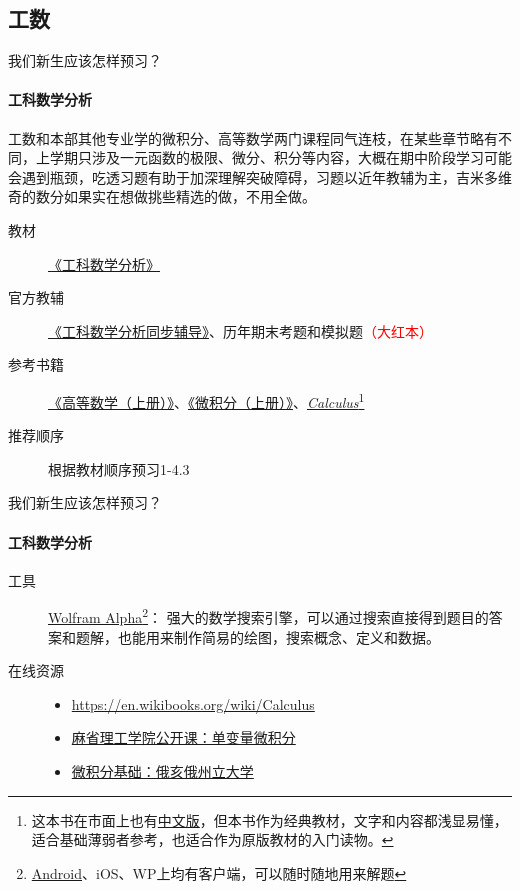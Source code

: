 \documentclass[xcolor={usenames,dvipsnames}]{beamer}
\begin{document}
\subsection{工数}
\begin{frame}{我们新生应该怎样预习？}
\framesubtitle{工科数学分析}
\begin{block}{}
工数和本部其他专业学的微积分、高等数学两门课程同气连枝，在某些章节略有不同，上学期只涉及一元函数的极限、微分、积分等内容，大概在期中阶段学习可能会遇到瓶颈，吃透习题有助于加深理解突破障碍，习题以近年教辅为主，吉米多维奇的数分如果实在想做挑些精选的做，不用全做。
\end{block}
\begin{description}
    \item[教材\faGraduationCap] \href{http://opac.lib.dlut.edu.cn/opac/item.php?marc_no=2008000575}{《工科数学分析》}
    \item[官方教辅\faPencil] \href{http://opac.lib.dlut.edu.cn/opac/item.php?marc_no=2010052839}{《工科数学分析同步辅导》}、历年期末考题和模拟题\textcolor{red}{（大红本）}
    \item[参考书籍\faBook] \href{http://opac.lib.dlut.edu.cn/opac/item.php?marc_no=2007023436}{《高等数学（上册）》}、\href{http://opac.lib.dlut.edu.cn/opac/item.php?marc_no=2009018280}{《微积分（上册）》}、\href{http://www.cengagebrain.com/content/stewart97815_0538497815_01.01_toc.pdf}{\textit{Calculus}}\footnote{这本书在市面上也有\href{http://item.jd.com/10075433.html}{中文版}，但本书作为经典教材，文字和内容都浅显易懂，适合基础薄弱者参考，也适合作为原版教材的入门读物。}
    \item[推荐顺序\faSortNumericAsc] 根据教材顺序预习1-4.3
    
\end{description}
\end{frame}

\begin{frame}{我们新生应该怎样预习？}
\framesubtitle{工科数学分析}
\begin{description}
 \item[工具\faWrench] \href{http://www.wolframalpha.com/}{Wolfram Alpha}\footnote{\href{https://play.google.com/store/apps/details?id=com.wolfram.android.alpha}{Android}、iOS、WP上均有客户端，可以随时随地用来解题}： 强大的数学搜索引擎，可以通过搜索直接得到题目的答案和题解，也能用来制作简易的绘图，搜索概念、定义和数据。
 \item[在线资源\faExternalLink] \begin{itemize}
 \item \faLink\url{https://en.wikibooks.org/wiki/Calculus}
 \item \href{http://open.163.com/special/sp/singlevariablecalculus.html}{麻省理工学院公开课：单变量微积分}
 \item \href{https://www.coursera.org/learn/calculus1}{微积分基础：俄亥俄州立大学} 

 \end{itemize}
\end{description}
\end{frame}
\end{document}
